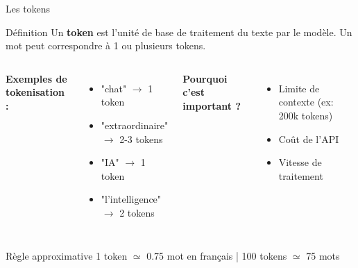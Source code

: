 \begin{frame}{Les tokens}
\begin{block}{Définition}
Un \textbf{token} est l'unité de base de traitement du texte par le modèle. Un mot peut correspondre à 1 ou plusieurs tokens.
\end{block}

\vspace{0.3cm}

\begin{columns}
\textbf{Exemples de tokenisation :}
\begin{itemize}
    \item "chat" $\rightarrow$ 1 token
    \item "extraordinaire" $\rightarrow$ 2-3 tokens
    \item "IA" $\rightarrow$ 1 token
    \item "l'intelligence" $\rightarrow$ 2 tokens
\end{itemize}

\textbf{Pourquoi c'est important ?}
\begin{itemize}
    \item Limite de contexte (ex: 200k tokens)
    \item Coût de l'API
    \item Vitesse de traitement
\end{itemize}
\end{columns}

\vspace{0.3cm}
\begin{exampleblock}{Règle approximative}
1 token $\simeq$  0.75 mot en français | 100 tokens $\simeq$ 75 mots
\end{exampleblock}
\end{frame}

